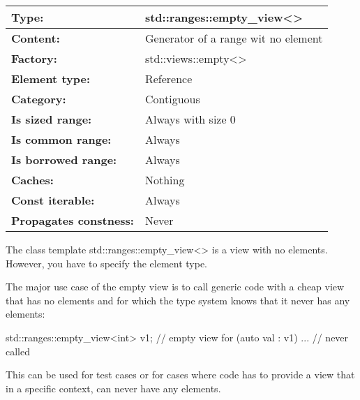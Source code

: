 \begin{longtable}[c]{|l|l|}
\hline
\textbf{Type:}                 & std::ranges::empty\_view\textless{}\textgreater{} \\ \hline
\endfirsthead
%
\endhead
%
\textbf{Content:}              & Generator of a range wit no element               \\ \hline
\textbf{Factory:}              & std::views::empty\textless{}\textgreater{}        \\ \hline
\textbf{Element type:}         & Reference                                         \\ \hline
\textbf{Category:}             & Contiguous                                        \\ \hline
\textbf{Is sized range:}       & Always with size 0                                \\ \hline
\textbf{Is common range:}      & Always                                            \\ \hline
\textbf{Is borrowed range:}    & Always                                            \\ \hline
\textbf{Caches:}               & Nothing                                           \\ \hline
\textbf{Const iterable:}       & Always                                            \\ \hline
\textbf{Propagates constness:} & Never                                             \\ \hline
\end{longtable}

The class template std::ranges::empty\_view<> is a view with no elements. However, you have to specify the element type.

The major use case of the empty view is to call generic code with a cheap view that has no elements and for which the type system knows that it never has any elements:


\begin{cpp}
std::ranges::empty_view<int> v1; // empty view
for (auto val : v1) {
	... // never called
}
\end{cpp}

This can be used for test cases or for cases where code has to provide a view that in a specific context, can never have any elements.

